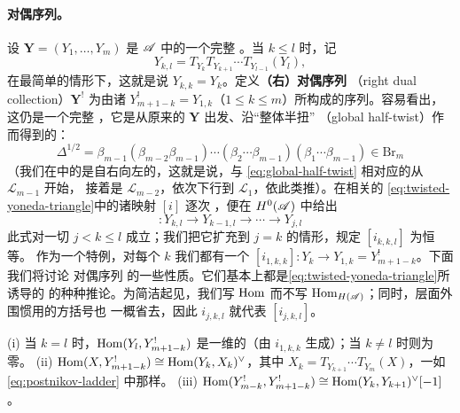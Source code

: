 \paragraph{\trKoszul{}对偶序列。}\label{sub:koszul-dual-collection}
设 $\mathbf{Y}=(Y_1,\ldots,Y_m)$ 是 $\mathscr{A}$ 中的一个完整%
\trExceptionalCollection。当 $k\le l$ 时，记
\begin{equation*}
Y_{k,l}=T_{Y_k}T_{Y_{k+1}}\cdots T_{Y_{l-1}}(Y_l),
\end{equation*}
在最简单的情形下，这就是说 $Y_{k,k}=Y_k$。定义\textbf{（右）\trKoszul{}对偶序列}
（right \trKoszul{} dual collection）$\mathbf{Y}^!$ 为由诸\trObject{}%
$Y^!_{m+1-k}=Y_{1,k}$（$1\le k\le m$）所构成的序列。容易看出，这仍是一个完整%
\trExceptionalCollection，它是从原来的 $\mathbf{Y}$ 出发、沿“整体半扭”
（global half-twist）作\trMutation{}而得到的：
\begin{equation}\label{eq:global-half-twist}
\Delta^{1/2}=\beta_{m-1}(\beta_{m-2}\beta_{m-1})\cdots
(\beta_2\cdots\beta_{m-1})(\beta_1\cdots\beta_{m-1})\in\mathrm{Br}_m
\end{equation}
（我们在\trBraidGroup{}中的\trComposition{}是自右向左的，这就是说，与
\eqref{eq:global-half-twist} 相对应的\trMutation{}从 $\mathscr{L}_{m-1}$ 开始，
接着是 $\mathscr{L}_{m-2}$，依次下行到 $\mathscr{L}_1$，依此类推）。在相关的%
\trExactTriangle{} \eqref{eq:twisted-yoneda-triangle}中的诸映射 $[i]$ 逐次%
\trComposition，便在 $H^0(\mathscr{A})$ 中给出\trCanonical{}\trMorphism
\begin{equation*}
[i_{j,k,l}]\colon Y_{k,l}\longrightarrow Y_{k-1,l}
\longrightarrow\cdots\longrightarrow Y_{j,l}
\end{equation*}
此式对一切 $j<k\le l$ 成立；我们把它扩充到 $j=k$ 的情形，规定 $[i_{k,k,l}]$
为恒等。
作为一个特例，对每个 $k$ 我们都有一个\trCanonical{}\trMorphism{}%
$[i_{1,k,k}]\colon Y_k\to Y_{1,k}=Y^!_{m+1-k}$。下面我们将讨论 \trKoszul{}对偶序列
的一些性质。它们基本上都是\eqref{eq:twisted-yoneda-triangle}所诱导的%
\trLongExactSequence{}的种种推论。为简洁起见，我们写 $\operatorname{Hom}$ 而不写
$\operatorname{Hom}_{H(\mathscr{A})}$；同时，\trCohomology{}层面\trMorphism{}外围惯用的方括号也
一概省去，因此 $i_{j,k,l}$ 就代表 $[i_{j,k,l}]$。

\begin{lemma}\label{thm:koszul-dual-hom-properties}
(i) 当 $k=l$ 时，$\operatorname{Hom}(Y_l,Y^!_{m+1-k})$ 是一维的（由 $i_{1,k,k}$ 生成）；当
$k\neq l$ 时则为零。
(ii) $\operatorname{Hom}(X,Y^!_{m+1-k})\cong\operatorname{Hom}(Y_k,X_k)^{\vee}$，其中
$X_k=T_{Y_{k+1}}\cdots T_{Y_m}(X)$，一如\eqref{eq:postnikov-ladder} 中那样。
(iii) $\operatorname{Hom}(Y^!_{m-k},Y^!_{m+1-k})\cong\operatorname{Hom}(Y_k,Y_{k+1})^{\vee}[-1]$。
\end{lemma}

